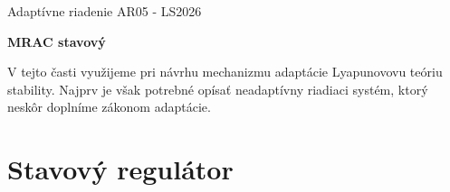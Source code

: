 \documentclass[a4paper, 10pt, ]{article}
\def\oznacenieCasti{AR05 - LS2026}
\begin{document}
\lstset{%
style=mystyle,
rangebeginprefix=\#\#\#\ cellB\ ,%
rangebeginsuffix=\ \#\#\#,%
rangeendprefix=\#\#\#\ cellE\ ,%
rangeendsuffix=\ \#\#\#,%
includerangemarker=false,
}




\fontsize{12pt}{22pt}\selectfont

\centerline{\textsf{Adaptívne riadenie} \hfill \textsf{\oznacenieCasti}}

\fontsize{18pt}{22pt}\selectfont








\begin{flushleft}
    \textbf{\textsf{MRAC stavový}}
\end{flushleft}







\normalsize

\bigskip

{\hypersetup{hidelinks}

\tableofcontents

}

\bigskip

\vspace{18pt}






\noindent
\lettrine[lines=3, nindent=0pt]{V}{} tejto časti využijeme pri návrhu mechanizmu adaptácie Lyapunovovu teóriu stability. Najprv je však potrebné opísať neadaptívny riadiaci systém, ktorý neskôr doplníme zákonom adaptácie.












\section{Stavový regulátor}
\label{Stavový regulátor ($n=2$)}
\end{document}
